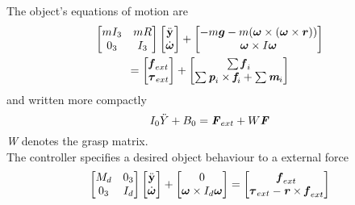 \documentclass[conference]{IEEEtran}
\begin{document}
The object's equations of motion are 
\begin{multline}
\begin{bmatrix}mI_3 & mR \\0_3 & I_3\end{bmatrix}
\begin{bmatrix}\ddot{\textbf{y}}\\\dot{\boldsymbol{\omega}}\end{bmatrix} + 
\begin{bmatrix}-m\boldsymbol{g}-m(\boldsymbol{\omega} \times (\boldsymbol{\omega} \times \boldsymbol{r}))\\\boldsymbol{\omega} \times I \boldsymbol{\omega}\end{bmatrix}\\
=\begin{bmatrix}\textbf{\textit{f}}_{ext}\\\boldsymbol{\tau}_{ext}\end{bmatrix}+
\begin{bmatrix}\sum\textbf{\textit{f}}_i\\\sum\textit{\textbf{p}}_i \times \textit{\textbf{f}}_i + \sum\textit{\textbf{m}}_i\end{bmatrix}
\end{multline}
and written more compactly
\begin{equation}\label{actualobjectimpedance}
I_0\ddot{Y}+B_0 = \textbf{\textit{F}}_{ext}+W\textbf{\textit{F}}
\end{equation}
\textit{W} denotes the grasp matrix. \\
The controller specifies a desired object behaviour to a external force
\begin{equation}
\begin{bmatrix}M_d & 0_3 \\0_3 & I_d\end{bmatrix}
\begin{bmatrix}\ddot{\textbf{y}}\\\dot{\boldsymbol{\omega}}\end{bmatrix} + 
\begin{bmatrix}0\\\boldsymbol{\omega} \times I_d \boldsymbol{\omega}\end{bmatrix}
=\begin{bmatrix}\textbf{\textit{f}}_{ext}\\\boldsymbol{\tau}_{ext}-\textbf{\textit{r}}\times\textbf{\textit{f}}_{ext}\end{bmatrix}
\end{equation}
\end{document}
